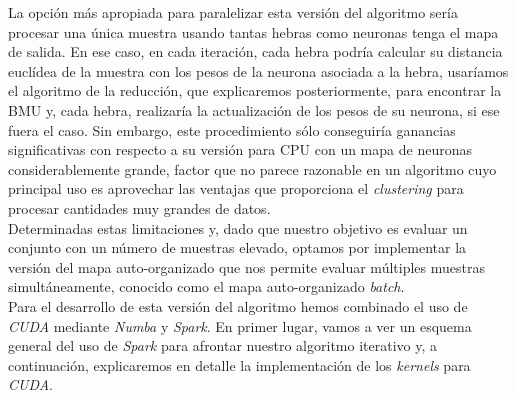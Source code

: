 La opción más apropiada para paralelizar esta versión del algoritmo sería procesar una única muestra usando tantas hebras como neuronas tenga el mapa de salida. En ese caso, en cada iteración, cada hebra podría calcular su distancia euclídea de la muestra con los pesos de la neurona asociada a la hebra, usaríamos el algoritmo de la reducción, que explicaremos posteriormente, para encontrar la BMU y, cada hebra, realizaría la actualización de los pesos de su neurona, si ese fuera el caso. Sin embargo, este procedimiento sólo conseguiría ganancias significativas con respecto a su versión para CPU con un mapa de neuronas considerablemente grande, factor que no parece razonable en un algoritmo cuyo principal uso es aprovechar las ventajas que proporciona el \textit{clustering} para procesar cantidades muy grandes de datos.\\

Determinadas estas limitaciones y, dado que nuestro objetivo es evaluar un conjunto con un número de muestras elevado, optamos por implementar la versión del mapa auto-organizado que nos permite evaluar múltiples muestras simultáneamente, conocido como el mapa auto-organizado \textit{batch}.\\


Para el desarrollo de esta versión del algoritmo hemos combinado el uso de \textit{CUDA} mediante \textit{Numba} y \textit{Spark}. En primer lugar, vamos a ver un esquema general del uso de \textit{Spark} para afrontar nuestro algoritmo iterativo y, a continuación, explicaremos en detalle la implementación de los \textit{kernels} para \textit{CUDA}.

